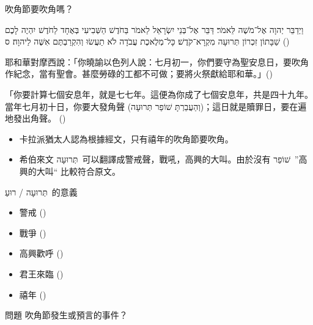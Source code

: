 \documentclass{beamer}
\makeatletter
\newcommand{\biblerefhebrew}[1]{\brm@bibleref{hebrew}{#1}}
\newcommand{\question}[1]{
\begin{frame}{問題}
    \centering
    \vspace*{1cm}
    \huge #1？\par
    \vfill
\end{frame}
}
\newcommand{\parvspace}{\par\vspace{0.5em}}
\makeatother
\begin{document}
\begin{frame}{吹角節要吹角嗎？}
    \begin{hebrew}וַיְדַבֵּר יְהוָה אֶל־מֹשֶׁה לֵּאמֹר׃ דַּבֵּר אֶל־בְּנֵי יִשְׂרָאֵל לֵאמֹר בַּחֹדֶשׁ הַשְּׁבִיעִי בְּאֶחָד לַחֹדֶשׁ יִהְיֶה לָכֶם שַׁבָּתוֹן זִכְרוֹן \alert{תְּרוּעָה} מִקְרָא־קֹדֶשׁ׃ כָּל־מְלֶאכֶת עֲבֹדָה לֹא תַעֲשׂוּ וְהִקְרַבְתֶּם אִשֶּׁה לַיהוָה׃ ס (\biblerefhebrew{Lv 23:23-25})\end{hebrew}\parvspace
    耶和華對摩西說：「你曉諭以色列人說：\alert{七月初一}，你們要守為\alert{聖安息日}，要吹角作紀念，當有聖會。甚麼勞碌的工都不可做；要將火祭獻給耶和華。」()\parvspace
    「你要計算七個安息年，就是七七年。這便為你成了七個安息年，共是四十九年。 當年七月初十日，你要\alert{大發角聲 (\texthebrew{וְהַעֲבַרְתָּ שׁוֹפַר תְּרוּעָה})}；這日就是贖罪日，要在遍地發出角聲。 ()\parvspace
    \begin{itemize}
        \item 卡拉派猶太人認為根據經文，只有禧年的吹角節要吹角。\parencite{Karaism}
        \item 希伯來文 \texthebrew{תְּרוּעָה}\ 可以翻譯成警戒聲，戰吼，高興的大叫。由於沒有 \texthebrew{שׁוֹפַר}\ ”高興的大叫“ 比較符合原文。
    \end{itemize}
\end{frame}

\begin{frame}{\texthebrew{תְּרוּעָה / רוּעַ}\ 的意義}
    \begin{itemize}
        \item 警戒 ()
        \item 戰爭 ()
        \item 高興歡呼 ()
        \item 君王來臨 ()
        \item 禧年 ()
    \end{itemize}
\end{frame}

\question{吹角節發生或預言的事件}
\end{document}
